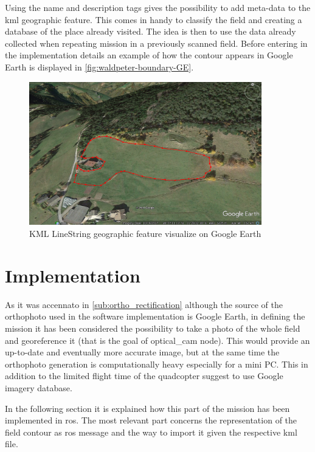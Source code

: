 Using the \textsf{name} and \textsf{description} tags gives the possibility to add meta-data to the \acrshort{kml} geographic feature. This comes in handy to classify the field and creating a database of the place already visited. The idea is then to use the data already collected when repeating mission in a previously scanned field.
Before entering in the implementation details an example of how the contour appears in Google Earth is displayed in \autoref{fig:waldpeter-boundary-GE}.
\begin{figure}[ht]
    \centering
    \includegraphics[width=0.9\textwidth]{figures/C2/waldpeter-boundary-GE.png}
    \caption{KML LineString geographic feature visualize on Google Earth}
    \label{fig:waldpeter-boundary-GE}
\end{figure}

\section{Implementation} %
\label{sec:implementation}
As it was accennato in \ref{sub:ortho_rectification} although the source of the orthophoto used in the software implementation is Google Earth, in defining the mission it has been considered the possibility to take a photo of the whole field and georeference it (that is the goal of \textsf{optical\_cam} node). This would provide an up-to-date and eventually more accurate image, but at the same time the orthophoto generation is computationally heavy especially for a mini PC. This in addition to the limited flight time of the quadcopter suggest to use Google imagery database.\par
In the following section it is explained how this part of the mission has been implemented in \acrshort{ros}. The most relevant part concerns the representation of the field contour as \acrshort{ros} message and the way to import it given the respective \acrshort{kml} file.

